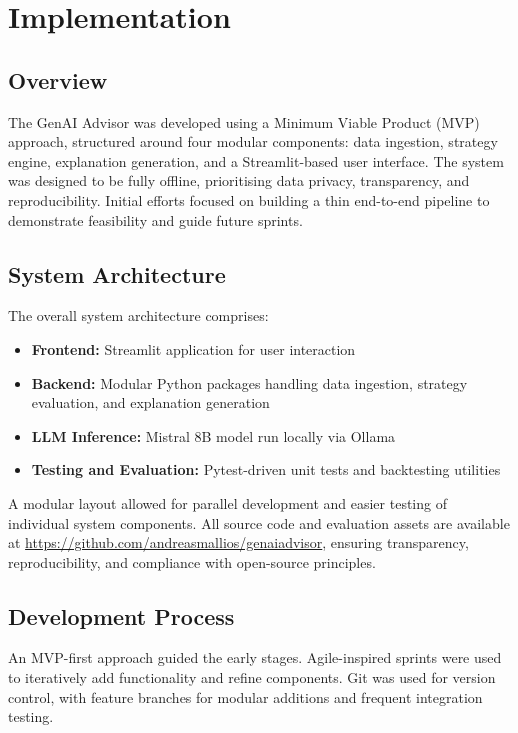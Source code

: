 \section{Implementation}

\subsection{Overview}

The GenAI Advisor was developed using a Minimum Viable Product (MVP) approach, structured around four modular components: data ingestion, strategy engine, explanation generation, and a Streamlit-based user interface. The system was designed to be fully offline, prioritising data privacy, transparency, and reproducibility. Initial efforts focused on building a thin end-to-end pipeline to demonstrate feasibility and guide future sprints.

\subsection{System Architecture}

The overall system architecture comprises:
\begin{itemize}
    \item \textbf{Frontend:} Streamlit application for user interaction
    \item \textbf{Backend:} Modular Python packages handling data ingestion, strategy evaluation, and explanation generation
    \item \textbf{LLM Inference:} Mistral 8B model run locally via Ollama
    \item \textbf{Testing and Evaluation:} Pytest-driven unit tests and backtesting utilities
\end{itemize}

A modular layout allowed for parallel development and easier testing of individual system components. All source code and evaluation assets are available at \url{https://github.com/andreasmallios/genaiadvisor}, ensuring transparency, reproducibility, and compliance with open-source principles.

\subsection{Development Process}

An MVP-first approach guided the early stages. Agile-inspired sprints were used to iteratively add functionality and refine components. Git was used for version control, with feature branches for modular additions and frequent integration testing.


